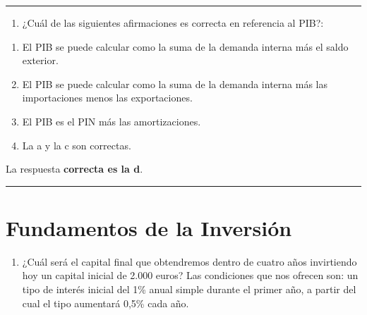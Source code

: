 \documentclass[
  letterpaper,
  DIV=11,
  numbers=noendperiod]{scrreprt}
\providecommand{\tightlist}{%
  \setlength{\itemsep}{0pt}\setlength{\parskip}{0pt}}\usepackage{longtable,booktabs,array}
\begin{document}
\begin{center}\rule{0.5\linewidth}{0.5pt}\end{center}

\begin{enumerate}
\def\labelenumi{\arabic{enumi}.}
\setcounter{enumi}{64}
\tightlist
\item
  ¿Cuál de las siguientes afirmaciones es correcta en referencia al
  PIB?:
\end{enumerate}

\begin{enumerate}
\def\labelenumi{\alph{enumi}.}
\item
  El PIB se puede calcular como la suma de la demanda interna más el
  saldo exterior.
\item
  El PIB se puede calcular como la suma de la demanda interna más las
  importaciones menos las exportaciones.
\item
  El PIB es el PIN más las amortizaciones.
\item
  La a y la c son correctas.
\end{enumerate}

\begin{tcolorbox}[enhanced jigsaw, left=2mm, opacityback=0, colback=white, breakable, arc=.35mm, bottomrule=.15mm, rightrule=.15mm, toprule=.15mm, leftrule=.75mm, colframe=quarto-callout-tip-color-frame]
\begin{minipage}[t]{5.5mm}
\textcolor{quarto-callout-tip-color}{\faLightbulb}
\end{minipage}%
\begin{minipage}[t]{\textwidth - 5.5mm}

La respuesta \textbf{correcta es la d}.

\end{minipage}%
\end{tcolorbox}

\begin{center}\rule{0.5\linewidth}{0.5pt}\end{center}

\hypertarget{fundamentos-de-la-inversiuxf3n}{%
\section*{Fundamentos de la
Inversión}\label{fundamentos-de-la-inversiuxf3n}}


\begin{enumerate}
\def\labelenumi{\arabic{enumi}.}
\tightlist
\item
  ¿Cuál será el capital final que obtendremos dentro de cuatro años
  invirtiendo hoy un capital inicial de 2.000 euros? Las condiciones que
  nos ofrecen son: un tipo de interés inicial del 1\% anual simple
  durante el primer año, a partir del cual el tipo aumentará 0,5\% cada
  año.
\end{enumerate}
\end{document}
